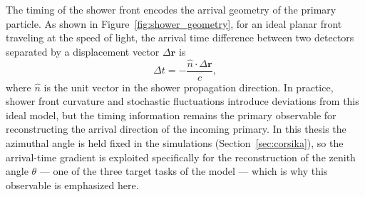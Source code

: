 The timing of the shower front encodes the arrival geometry of the primary particle. As shown in Figure~\ref{fig:shower_geometry}, for an ideal planar front traveling at the speed of light, the arrival time difference between two detectors separated by a displacement vector $\Delta \textbf{r}$ is
\begin{equation}
    \Delta t = -\frac{\hat{n}\cdot \Delta \textbf{r}}{c},
    \label{eq:front}
\end{equation}
where $\hat{n}$ is the unit vector in the shower propagation direction. In practice, shower front curvature and stochastic fluctuations introduce deviations from this ideal model, but the timing information remains the primary observable for reconstructing the arrival direction of the incoming primary. In this thesis the azimuthal angle is held fixed in the simulations (Section~\ref{sec:corsika}), so the arrival-time gradient is exploited specifically for the reconstruction of the zenith angle $\theta$ --- one of the three target tasks of the model --- which is why this observable is emphasized here.

